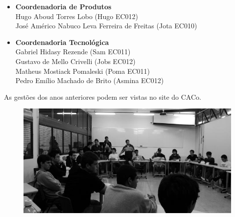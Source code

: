 \begin{itemize}
\item   \textbf{Coordenadoria de Produtos}
		\\Hugo Aboud Torres Lobo (Hugo EC012)
		\\José Américo Nabuco Leva Ferreira de Freitas (Jota EC010)

\item   \textbf{Coordenadoria Tecnológica}
		\\Gabriel Hidasy Rezende (Sam EC011)
		\\Gustavo de Mello Crivelli (Jobs EC012)
		\\Matheus Mostiack Pomaleski (Poma EC011)
		\\Pedro Emílio Machado de Brito (Asmina EC012)

\end{itemize}

As gestões dos anos anteriores podem ser vistas no site do CACo.

\begin{figure}[H]
    \centering
    \includegraphics[scale=0.29]{img/caco/pipocaco.jpg}
\end{figure}
